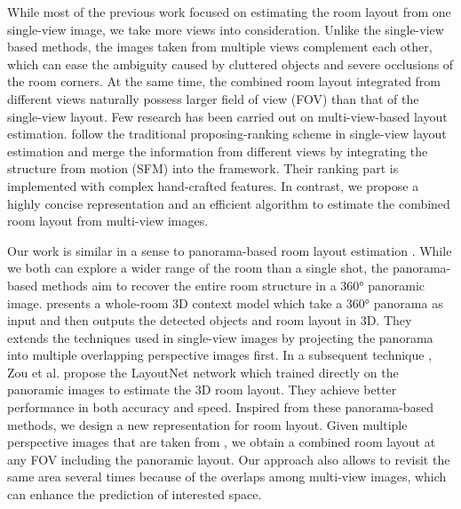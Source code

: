 %
While most of the previous work focused on estimating the room layout from one single-view image, we take more views into consideration. Unlike the single-view based methods, the images taken from multiple views complement each other, which can ease the ambiguity caused by cluttered objects and severe occlusions of the room corners. At the same time, the combined room layout integrated from different views naturally possess larger field of view (FOV) than that of the single-view layout. 
%
%
Few research has been carried out on multi-view-based layout estimation. \cite{wangmulti} follow the traditional proposing-ranking scheme in single-view layout estimation and merge the information from different views by integrating the structure from motion (SFM) into the framework. Their ranking part is implemented with complex hand-crafted features. 
%
In contrast, we propose a highly concise representation and an efficient algorithm to estimate the combined room layout from multi-view images.

%
Our work is similar in a sense to panorama-based room layout estimation \cite{zhang2014panocontext,zou2018layoutnet}. While we both can explore a wider range of the room than a single shot, the panorama-based methods aim to recover the entire room structure in a \ang{360} panoramic image. 
%
\cite{zhang2014panocontext} presents a whole-room 3D context model which take a \ang{360} panorama as input and then outputs the detected objects and room layout in 3D. 
They extends the techniques used in single-view images by projecting the panorama into multiple overlapping perspective images first. 
In a subsequent technique \cite{zou2018layoutnet}, Zou et al. propose the LayoutNet network which trained directly on the panoramic images to estimate the 3D room layout. They achieve better performance  in both accuracy and speed.
%
Inspired from these panorama-based methods, we design a new representation for room layout. Given multiple perspective images that are taken from , we obtain a combined room layout at any FOV including the panoramic layout. Our approach also allows to revisit the same area several times because of the overlaps among multi-view images, which can enhance the prediction of interested space.

